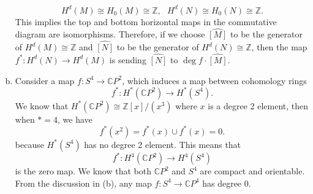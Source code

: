 \documentclass[letterpaper, 12pt]{article}
\begin{document}
\begin{solution}
\begin{enumerate}[(a)]
\[H^d(M)\cong H_0(M)\cong \mathbb{Z},\ \ \ H^d(N)\cong H_0(N)\cong \mathbb{Z}.\]
This implies the top and bottom horizontal maps in the commutative diagram are isomorphisms. Therefore, if we choose \(\widehat{[M]}\) to be the generator of \(H^d(M)\cong \mathbb{Z}\) and \(\widehat{[N]}\) to be the generator of \(H^d(N)\cong \mathbb{Z}\), then the map \(f^*:H^d(N)\rightarrow H^d(M)\) is sending \(\widehat{[N]}\) to \(\deg f\cdot \widehat{[M]}\).
\item Consider a map \(f:S^4\rightarrow \mathbb{C}P^2\), which induces a map between cohomology rings 
\[f^*:H^*(\mathbb{C}P^2)\rightarrow H^*(S^4).\]
We know that \(H^*(\mathbb{C}P^2)\cong \mathbb{Z}[x]/(x^3)\) where \(x\) is a degree 2 element, then when \(*=4\), we have 
\[f^*(x^2)=f^*(x)\cup f^*(x)=0.\]
because \(H^*(S^4)\) has no degree 2 element. This means that 
\[f^*:H^4(\mathbb{C}P^2)\rightarrow H^4(S^4)\]
is the zero map. We know that both \(\mathbb{C}P^2\) and \(S^4\) are compact and orientable. From the discussion in (b), any map \(f:S^4\rightarrow \mathbb{C}P^4\) has degree \(0\). 
\end{enumerate}
\end{solution}
\end{document}
